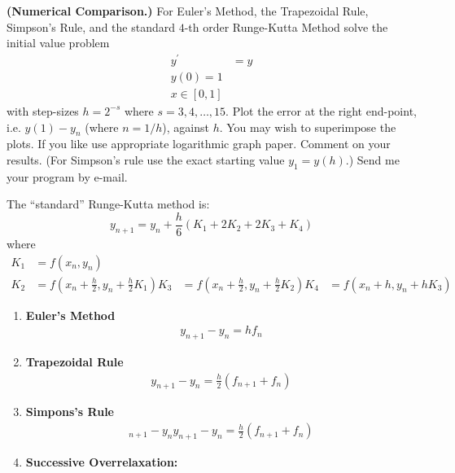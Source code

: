 \textbf{(Numerical Comparison.)} For Euler's Method, the Trapezoidal
Rule, Simpson's Rule, and the standard $4$-th order Runge-Kutta
Method solve the initial value problem
\begin{align}
y^\prime &= y \\
y(0) = 1\\
x \in [0,1]
\end{align}
with step-sizes $h = 2^{-s}$ where $s = 3,4,\dots,15$. Plot the error
at the right end-point, i.e. $y(1) - y_n$ (where $n = 1/h$), against
$h$. You may wish to superimpose the plots. If you like use
appropriate logarithmic graph paper. Comment on your results. (For
Simpson's rule use the exact starting value $y_1 = y(h)$.) Send me
your program by e-mail.

The ``standard'' Runge-Kutta method is:
\[
y_{n+1} = y_n + \frac{h}{6} (K_1 + 2K_2 + 2K_3 + K_4)
\]
where
\begin{align}
K_1 &= f(x_n, y_n) \\
K_2 &= f \left(x_n + \frac{h}{2}, y_n + \frac{h}{2} K_1 \right)
K_3 &= f \left(x_n + \frac{h}{2}, y_n + \frac{h}{2} K_2 \right)
K_4 &= f \left(x_n + h, y_n + h K_3 \right)
\end{align}

{\color{blue}

\begin{enumerate}
\item \textbf{Euler's Method}
\begin{align}
  y_{n+1} - y_n = h f_n
\end{align}

\item \textbf{Trapezoidal Rule}
\begin{align}
  y_{n+1}- y_n = \frac{h}{2} (f_{n+1} + f_n)
\end{align}

\item \textbf{Simpons's Rule}
\begin{align}
 _{n+1} - y_n
  y_{n+1}- y_n = \frac{h}{2} (f_{n+1} + f_n)
\end{align}

\item \textbf{Successive Overrelaxation:}

\end{enumerate}

}
